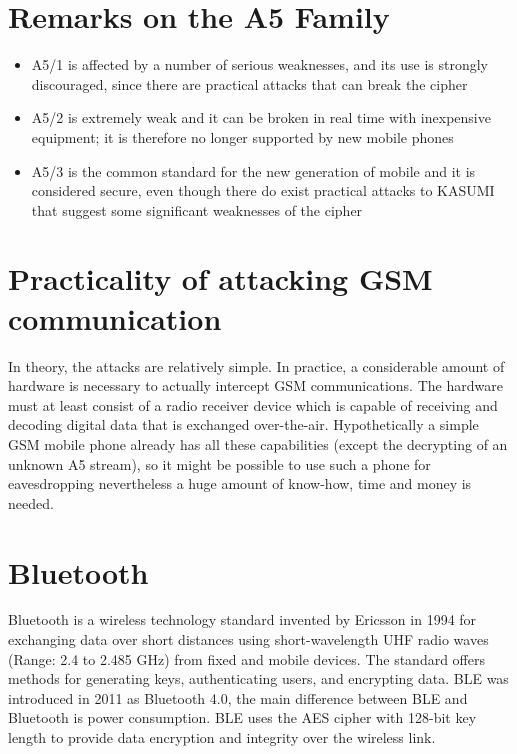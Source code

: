 \section{Remarks on the A5 Family}

\begin{itemize}
	\item A5/1 is affected by a number of serious weaknesses, and its use is strongly discouraged, since there are practical attacks that can break the cipher
	\item A5/2 is extremely weak and it can be broken in real time with inexpensive equipment; it is therefore no longer supported by new mobile phones
	\item A5/3 is the common standard for the new generation of mobile and it is considered secure, even though there do exist practical attacks to KASUMI that suggest some significant weaknesses of the cipher
\end{itemize}

\section{Practicality of attacking GSM communication}

In theory, the attacks are relatively simple. In practice, a considerable amount of hardware is necessary to actually intercept GSM communications. The hardware must at least consist of a radio receiver device which is capable of receiving and decoding digital data that is exchanged over-the-air. Hypothetically a simple GSM mobile phone already has all these capabilities (except the decrypting of an unknown A5 stream), so it might be possible to use such a phone for eavesdropping nevertheless a huge amount of know-how, time and money is needed.

\section{Bluetooth}
Bluetooth is a wireless technology standard invented by Ericsson in 1994 for exchanging data over short distances using short-wavelength UHF radio waves (Range: 2.4 to 2.485 GHz) from fixed and mobile devices.
The standard offers methods for generating keys, authenticating users, and encrypting data.
BLE was introduced in 2011 as Bluetooth 4.0, the main difference between BLE and Bluetooth is power consumption. BLE uses the AES cipher with 128-bit key length to provide data encryption and integrity over the wireless link.

